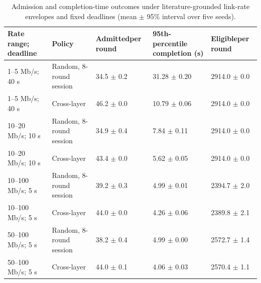 \begin{table}[!ht]
\caption{Admission and completion-time outcomes under literature-grounded link-rate envelopes and fixed deadlines (mean $\pm$ 95\% interval over five seeds).}
\label{tab:admission-boundary}
\centering
\setlength{\tabcolsep}{2pt}
\begin{tabular}{|p{}|p{}|p{}|p{}|p{}|}
\hline
Rate range; deadline & Policy & Admitted\newline{}per round & 95th-percentile completion (s) & Eligible\newline{}per round \\
\hline
1--5 Mb/s; 40 s & Random, 8-round session & 34.5 $\pm$ 0.2 & 31.28 $\pm$ 0.20 & 2914.0 $\pm$ 0.0 \\
\hline
1--5 Mb/s; 40 s & Cross-layer & 46.2 $\pm$ 0.0 & 10.79 $\pm$ 0.06 & 2914.0 $\pm$ 0.0 \\
\hline
10--20 Mb/s; 10 s & Random, 8-round session & 34.9 $\pm$ 0.4 & 7.84 $\pm$ 0.11 & 2914.0 $\pm$ 0.0 \\
\hline
10--20 Mb/s; 10 s & Cross-layer & 43.4 $\pm$ 0.0 & 5.62 $\pm$ 0.05 & 2914.0 $\pm$ 0.0 \\
\hline
10--100 Mb/s; 5 s & Random, 8-round session & 39.2 $\pm$ 0.3 & 4.99 $\pm$ 0.01 & 2394.7 $\pm$ 2.0 \\
\hline
10--100 Mb/s; 5 s & Cross-layer & 44.0 $\pm$ 0.0 & 4.26 $\pm$ 0.06 & 2389.8 $\pm$ 2.1 \\
\hline
50--100 Mb/s; 5 s & Random, 8-round session & 38.2 $\pm$ 0.4 & 4.99 $\pm$ 0.00 & 2572.7 $\pm$ 1.4 \\
\hline
50--100 Mb/s; 5 s & Cross-layer & 44.0 $\pm$ 0.1 & 4.06 $\pm$ 0.03 & 2570.4 $\pm$ 1.1 \\
\hline
\end{tabular}
\end{table}
